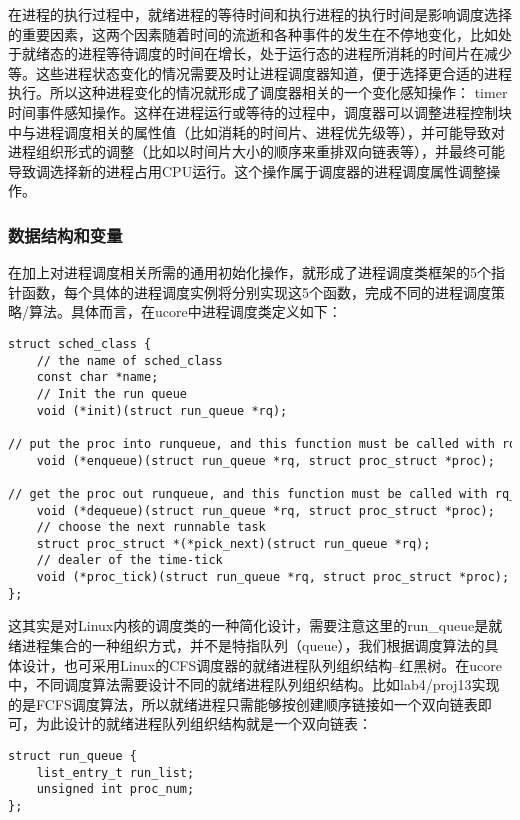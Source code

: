 在进程的执行过程中，就绪进程的等待时间和执行进程的执行时间是影响调度选择的重要因素，这两个因素随着时间的流逝和各种事件的发生在不停地变化，比如处于就绪态的进程等待调度的时间在增长，处于运行态的进程所消耗的时间片在减少等。这些进程状态变化的情况需要及时让进程调度器知道，便于选择更合适的进程执行。所以这种进程变化的情况就形成了调度器相关的一个变化感知操作：
timer时间事件感知操作。这样在进程运行或等待的过程中，调度器可以调整进程控制块中与进程调度相关的属性值（比如消耗的时间片、进程优先级等），并可能导致对进程组织形式的调整（比如以时间片大小的顺序来重排双向链表等），并最终可能导致调选择新的进程占用CPU运行。这个操作属于调度器的进程调度属性调整操作。

\subsubsection{数据结构和变量}\label{ux6570ux636eux7ed3ux6784ux548cux53d8ux91cf}

在加上对进程调度相关所需的通用初始化操作，就形成了进程调度类框架的5个指针函数，每个具体的进程调度实例将分别实现这5个函数，完成不同的进程调度策略/算法。具体而言，在ucore中进程调度类定义如下：

\begin{lstlisting}
struct sched_class {
    // the name of sched_class
    const char *name;
    // Init the run queue
    void (*init)(struct run_queue *rq);
    // put the proc into runqueue, and this function must be called with rq_lock
    void (*enqueue)(struct run_queue *rq, struct proc_struct *proc);
    // get the proc out runqueue, and this function must be called with rq_lock
    void (*dequeue)(struct run_queue *rq, struct proc_struct *proc);
    // choose the next runnable task
    struct proc_struct *(*pick_next)(struct run_queue *rq);
    // dealer of the time-tick
    void (*proc_tick)(struct run_queue *rq, struct proc_struct *proc);
};
\end{lstlisting}

这其实是对Linux内核的调度类的一种简化设计，需要注意这里的run\_queue是就绪进程集合的一种组织方式，并不是特指队列（queue），我们根据调度算法的具体设计，也可采用Linux的CFS调度器的就绪进程队列组织结构--红黑树。在ucore中，不同调度算法需要设计不同的就绪进程队列组织结构。比如lab4/proj13实现的是FCFS调度算法，所以就绪进程只需能够按创建顺序链接如一个双向链表即可，为此设计的就绪进程队列组织结构就是一个双向链表：

\begin{lstlisting}
struct run_queue {
    list_entry_t run_list;
    unsigned int proc_num;
};
\end{lstlisting}

